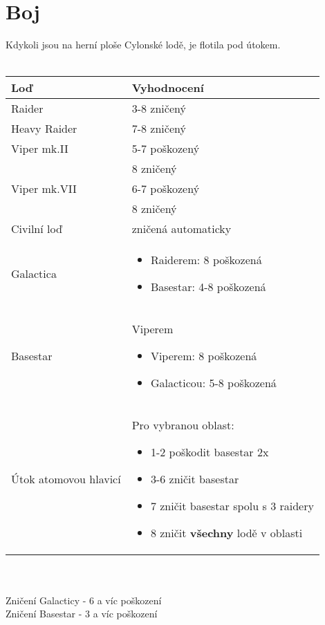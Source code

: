 \documentclass[a4paper,twocolumn]{article}
\begin{document}
\section{Boj}
Kdykoli jsou na herní ploše Cylonské lodě, je flotila pod útokem.\\
\\
\begin{tabular}{ | l | p{5.5cm} | }
\hline
\textbf{Loď} & 	\textbf{Vyhodnocení} \\
\hline
Raider & 		3-8 zničený \\
Heavy Raider & 	7-8 zničený \\
Viper mk.II & 	5-7 poškozený \\
&				8 zničený \\
Viper mk.VII &	6-7 poškozený \\
&				8 zničený \\
Civilní loď	&	zničená automaticky\\
Galactica &		\begin{itemize}
				\item[] Raiderem: 8 poškozená 
				\item[] Basestar: 4-8 poškozená
				\end{itemize}
				\\
Basestar & 		Viperem 
				\begin{itemize}
				\item[] Viperem: 8 poškozená
				\item[] Galacticou: 5-8 poškozená 
				\end{itemize}
				\\
Útok atomovou hlavicí & Pro vybranou oblast:
				\begin{itemize}
				\item[] 1-2 poškodit basestar 2x 
				\item[] 3-6 zničit basestar
				\item[] 7 zničit basestar spolu s 3 raidery
				\item[] 8 zničit \textbf{všechny} lodě v oblasti
				\end{itemize}
				\\
\hline
\end{tabular}
\\\\
Zničení Galacticy - 6 a víc poškození\\
Zničení Basestar - 3 a víc poškození\\
\end{document}

